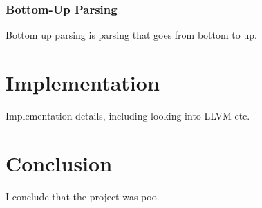 \documentclass[12pt]{report}
\begin{document}
\subsection{Bottom-Up Parsing}\label{subsec:bottom_up_parsing}
Bottom up parsing is parsing that goes from bottom to up.

\chapter{Implementation}
Implementation details, including looking into LLVM etc.

\chapter{Conclusion}
I conclude that the project was poo.



\end{document}
